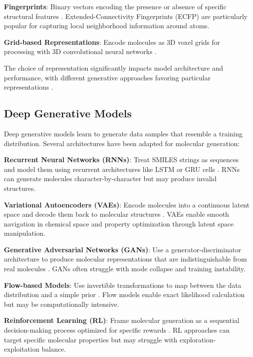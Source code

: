 \documentclass[conference]{IEEEtran}
\begin{document}
\textbf{Fingerprints}: Binary vectors encoding the presence or absence of specific structural features \cite{Rogers2010}. Extended-Connectivity Fingerprints (ECFP) are particularly popular for capturing local neighborhood information around atoms.

\textbf{Grid-based Representations}: Encode molecules as 3D voxel grids for processing with 3D convolutional neural networks \cite{Kuzminykh2018}.

The choice of representation significantly impacts model architecture and performance, with different generative approaches favoring particular representations \cite{Elton2019}.

\subsection{Deep Generative Models}
Deep generative models learn to generate data samples that resemble a training distribution. Several architectures have been adapted for molecular generation:

\textbf{Recurrent Neural Networks (RNNs)}: Treat SMILES strings as sequences and model them using recurrent architectures like LSTM or GRU cells \cite{Segler2018, Gupta2018}. RNNs can generate molecules character-by-character but may produce invalid structures.

\textbf{Variational Autoencoders (VAEs)}: Encode molecules into a continuous latent space and decode them back to molecular structures \cite{Gomez-Bombarelli2018, Kingma2013}. VAEs enable smooth navigation in chemical space and property optimization through latent space manipulation.

\textbf{Generative Adversarial Networks (GANs)}: Use a generator-discriminator architecture to produce molecular representations that are indistinguishable from real molecules \cite{De2018, Prykhodko2019, Goodfellow2014}. GANs often struggle with mode collapse and training instability.

\textbf{Flow-based Models}: Use invertible transformations to map between the data distribution and a simple prior \cite{Madhawa2019, Zang2020}. Flow models enable exact likelihood calculation but may be computationally intensive.

\textbf{Reinforcement Learning (RL)}: Frame molecular generation as a sequential decision-making process optimized for specific rewards \cite{Olivecrona2017, Popova2018}. RL approaches can target specific molecular properties but may struggle with exploration-exploitation balance.
\end{document}
